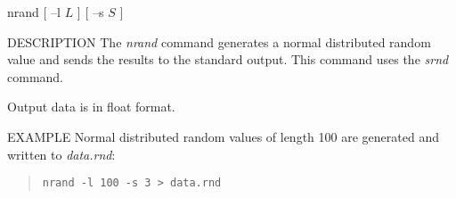 
\begin{synopsis}
\item[nrand] [ --l $L$ ] [ --s $S$ ]
\end{synopsis}

\begin{qsection}{DESCRIPTION}
The {\em nrand} command generates a normal distributed random value
and sends the results to the standard output.
This command uses the {\em srnd} command.
\par
Output data is in float format.
\end{qsection}

\begin{options}
\end{options}

\begin{qsection}{EXAMPLE}
Normal distributed random values of length 100 are generated
and written to {\em data.rnd}:
\begin{quote}
\verb!nrand -l 100 -s 3 > data.rnd!
\end{quote}
\end{qsection}
